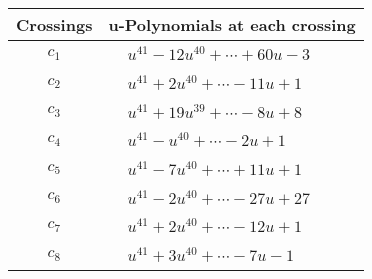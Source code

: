 \documentclass[1p]{elsarticle_modified}
\theoremstyle{definition}
\begin{document}
\begin{tabular}{m{50pt}|m{274pt}}
Crossings & \hspace{64pt}u-Polynomials at each crossing \\
\hline $$\begin{aligned}c_{1}\end{aligned}$$&$\begin{aligned}
&u^{41}-12 u^{40}+\cdots+60 u-3
\end{aligned}$\\
\hline $$\begin{aligned}c_{2}\end{aligned}$$&$\begin{aligned}
&u^{41}+2 u^{40}+\cdots-11 u+1
\end{aligned}$\\
\hline $$\begin{aligned}c_{3}\end{aligned}$$&$\begin{aligned}
&u^{41}+19 u^{39}+\cdots-8 u+8
\end{aligned}$\\
\hline $$\begin{aligned}c_{4}\end{aligned}$$&$\begin{aligned}
&u^{41}- u^{40}+\cdots-2 u+1
\end{aligned}$\\
\hline $$\begin{aligned}c_{5}\end{aligned}$$&$\begin{aligned}
&u^{41}-7 u^{40}+\cdots+11 u+1
\end{aligned}$\\
\hline $$\begin{aligned}c_{6}\end{aligned}$$&$\begin{aligned}
&u^{41}-2 u^{40}+\cdots-27 u+27
\end{aligned}$\\
\hline $$\begin{aligned}c_{7}\end{aligned}$$&$\begin{aligned}
&u^{41}+2 u^{40}+\cdots-12 u+1
\end{aligned}$\\
\hline $$\begin{aligned}c_{8}\end{aligned}$$&$\begin{aligned}
&u^{41}+3 u^{40}+\cdots-7 u-1
\end{aligned}$\\

\end{tabular}
\end{document}
